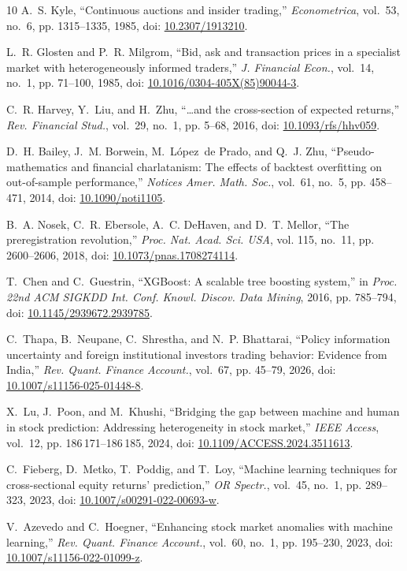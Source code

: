 \documentclass[conference]{IEEEtran}
\begin{document}
\begin{thebibliography}{10}
A.~S. Kyle, ``Continuous auctions and insider trading,'' \emph{Econometrica},
  vol.~53, no.~6, pp. 1315--1335, 1985, doi: \url{10.2307/1913210}.

L.~R. Glosten and P.~R. Milgrom, ``Bid, ask and transaction prices in a
  specialist market with heterogeneously informed traders,'' \emph{J. Financial
  Econ.}, vol.~14, no.~1, pp. 71--100, 1985, doi:
  \url{10.1016/0304-405X(85)90044-3}.

C.~R. Harvey, Y.~Liu, and H.~Zhu, ``{\ldots}and the cross-section of expected
  returns,'' \emph{Rev. Financial Stud.}, vol.~29, no.~1, pp. 5--68, 2016, doi:
  \url{10.1093/rfs/hhv059}.

D.~H. Bailey, J.~M. Borwein, M.~L{\'o}pez~de Prado, and Q.~J. Zhu,
  ``Pseudo-mathematics and financial charlatanism: The effects of backtest
  overfitting on out-of-sample performance,'' \emph{Notices Amer. Math. Soc.},
  vol.~61, no.~5, pp. 458--471, 2014, doi: \url{10.1090/noti1105}.

B.~A. Nosek, C.~R. Ebersole, A.~C. DeHaven, and D.~T. Mellor, ``The
  preregistration revolution,'' \emph{Proc. Nat. Acad. Sci. USA}, vol. 115,
  no.~11, pp. 2600--2606, 2018, doi: \url{10.1073/pnas.1708274114}.

T.~Chen and C.~Guestrin, ``{XGBoost}: A scalable tree boosting system,'' in
  \emph{Proc. 22nd ACM SIGKDD Int. Conf. Knowl. Discov. Data Mining}, 2016, pp.
  785--794, doi: \url{10.1145/2939672.2939785}.

C.~Thapa, B.~Neupane, C.~Shrestha, and N.~P. Bhattarai, ``Policy information
  uncertainty and foreign institutional investors trading behavior: Evidence
  from {India},'' \emph{Rev. Quant. Finance Account.}, vol.~67, pp. 45--79,
  2026, doi: \url{10.1007/s11156-025-01448-8}.

X.~Lu, J.~Poon, and M.~Khushi, ``Bridging the gap between machine and human in
  stock prediction: Addressing heterogeneity in stock market,'' \emph{IEEE
  Access}, vol.~12, pp. 186\,171--186\,185, 2024, doi:
  \url{10.1109/ACCESS.2024.3511613}.

C.~Fieberg, D.~Metko, T.~Poddig, and T.~Loy, ``Machine learning techniques for
  cross-sectional equity returns' prediction,'' \emph{OR Spectr.}, vol.~45,
  no.~1, pp. 289--323, 2023, doi: \url{10.1007/s00291-022-00693-w}.

V.~Azevedo and C.~Hoegner, ``Enhancing stock market anomalies with machine
  learning,'' \emph{Rev. Quant. Finance Account.}, vol.~60, no.~1, pp.
  195--230, 2023, doi: \url{10.1007/s11156-022-01099-z}.


\end{thebibliography}
\end{document}

